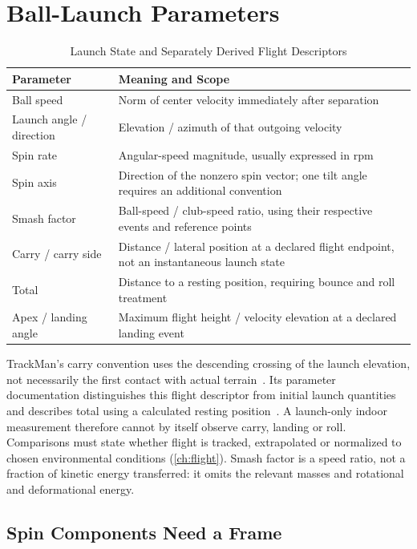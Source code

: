 \section{Ball-Launch Parameters}

\begin{table}[htbp]
\centering\small
\caption{Launch State and Separately Derived Flight Descriptors}
\label{tab:ballparams}
\begin{tabular}{@{}p{3.2cm}p{10.8cm}@{}}
\toprule
\textbf{Parameter} & \textbf{Meaning and Scope} \\
\midrule
Ball speed & Norm of center velocity immediately after separation \\
Launch angle / direction & Elevation / azimuth of that outgoing velocity \\
Spin rate & Angular-speed magnitude, usually expressed in rpm \\
Spin axis & Direction of the nonzero spin vector; one tilt angle requires an additional convention \\
Smash factor & Ball-speed / club-speed ratio, using their respective events and reference points \\
Carry / carry side & Distance / lateral position at a declared flight endpoint, not an instantaneous launch state \\
Total & Distance to a resting position, requiring bounce and roll treatment \\
Apex / landing angle & Maximum flight height / velocity elevation at a declared landing event \\
\bottomrule
\end{tabular}
\end{table}

TrackMan's carry convention uses the descending crossing of the launch elevation, not necessarily the first contact with actual terrain~\cite{trackmancarry}.
Its parameter documentation distinguishes this flight descriptor from initial launch quantities and describes total using a calculated resting position~\cite{trackmanparameterdefinitions}.
A launch-only indoor measurement therefore cannot by itself observe carry, landing or roll.
Comparisons must state whether flight is tracked, extrapolated or normalized to chosen environmental conditions (\cref{ch:flight}).
Smash factor is a speed ratio, not a fraction of kinetic energy transferred: it omits the relevant masses and rotational and deformational energy.

\subsection{Spin Components Need a Frame}

